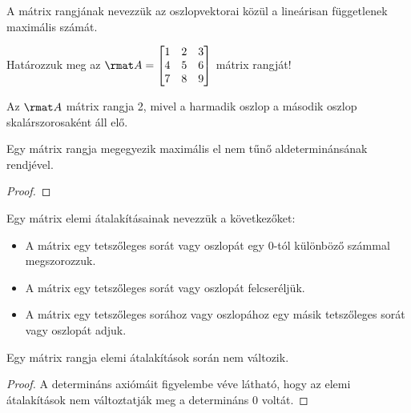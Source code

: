 \begin{definition}
  A mátrix rangjának nevezzük az oszlopvektorai közül a lineárisan függetlenek
  maximális számát.
\end{definition}

\begin{example}
  \bgroup\sffamily
  Határozzuk meg az $\rmat A = \begin{bmatrix}
      1 & 2 & 3 \\
      4 & 5 & 6 \\
      7 & 8 & 9
    \end{bmatrix}$ mátrix rangját!
  \egroup

  \hdashrule[.8ex][x]{\dimexpr\textwidth}{1pt}{2mm 3pt}
  Az $\rmat A$ mátrix rangja 2, mivel a harmadik oszlop a második oszlop
  skalárszorosaként áll elő.
\end{example}

\begin{theorem}
  Egy mátrix rangja megegyezik maximális el nem tűnő aldeterminánsának
  rendjével.

  \begin{proof}
    \vspace{10em}
  \end{proof}
\end{theorem}

\begin{definition}
  Egy mátrix elemi átalakításainak nevezzük a következőket:
  \begin{itemize}
    \item A mátrix egy tetszőleges sorát vagy oszlopát egy 0-tól különböző
          számmal megszorozzuk.

    \item A mátrix egy tetszőleges sorát vagy oszlopát felcseréljük.

    \item A mátrix egy tetszőleges sorához vagy oszlopához egy másik tetszőleges
          sorát vagy oszlopát adjuk.
  \end{itemize}
\end{definition}

\begin{statement}
  Egy mátrix rangja elemi átalakítások során nem változik.

  \begin{proof}
    A determináns axiómáit figyelembe véve látható, hogy az elemi
    átalakítások nem változtatják meg a determináns 0 voltát.
  \end{proof}
\end{statement}

